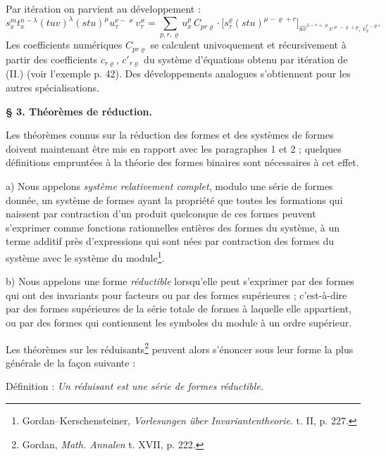 \documentclass[11pt]{article}
\begin{document}
Par itération on parvient au développement :
\[
\tag{III}
s_x^m t_x^{n-\lambda}(tuv)^\lambda(stu)^\mu u_\tau^{\nu-\varkappa}v_\tau^\varkappa
=
\sum_{p,r,\varrho}u_x^p\,C_{pr\varrho}\cdot
\bigl[s_\tau^\varrho(stu)^{\mu-\varrho+r}\bigr]_{\widehat{uv}^{\lambda-r+\varrho}v^{\varkappa-\varrho+p},\,v_x^{r-p}}.
\]
Les coefficients numériques $C_{pr\varrho}$ se calculent univoquement et récursivement à partir des coefficients $c_{r\varrho}$, $c'_{r\varrho}$ du système d'équations obtenu par itération de (II.) (voir l'exemple p. 42). Des développements analogues s'obtiennent pour les autres spécialisations.

\begin{center}
\textbf{\S{} 3. \quad Théorèmes de réduction.}
\end{center}

Les théorèmes connus sur la réduction des formes et des systèmes de formes doivent maintenant être mis en rapport avec les paragraphes 1 et 2 ; quelques définitions empruntées à la théorie des formes binaires sont nécessaires à cet effet.

a) Nous appelons \emph{système relativement complet}, modulo une série de formes donnée, un système de formes ayant la propriété que toutes les formations qui naissent par contraction d'un produit quelconque de ces formes peuvent s'exprimer comme fonctions rationnelles entières des formes du système, à un terme additif près d'expressions qui sont nées par contraction des formes du système avec le système du module\footnote{Gordan--Kerschensteiner, \emph{Vorlesungen über Invariantentheorie}. t. II, p. 227.}.

b) Nous appelons une forme \emph{réductible} lorsqu'elle peut s'exprimer par des formes qui ont des invariants pour facteurs ou par des \og{} formes supérieures \fg{} ; c'est-à-dire par des formes supérieures de la série totale de formes à laquelle elle appartient, ou par des formes qui contiennent les symboles du module à un ordre supérieur.

Les théorèmes sur les réduisants\footnote{Gordan, \emph{Math. Annalen} t. XVII, p. 222.} peuvent alors s'énoncer sous leur forme la plus générale de la façon suivante :

Définition : \emph{Un réduisant est une série de formes réductible.}
\end{document}
